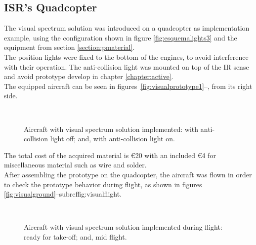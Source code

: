 \subsection{ISR's Quadcopter}
\label{subsection:pisr}

The visual spectrum solution was introduced on a quadcopter as implementation example, using the configuration shown in figure \ref{fig:esquemalights3} and the equipment from section \ref{section:pmaterial}.\\
The position lights were fixed to the bottom of the engines, to avoid interference with their operation. The anti-collision light was mounted on top of the IR sense and avoid prototype develop in chapter \ref{chapter:active}.\\
The equipped aircraft can be seen in figures~\ref{fig:visualprototype1}--, from its right side.\\
\begin{figure}[ht]
  \centering
  \hspace{8pt}
  \\
  \caption[Aircraft with Visual Spectrum Solution Implemented]{Aircraft with visual spectrum solution implemented:
			 with anti-collision light off; and,
			 with anti-collision light on.}%
  \label{fig:visualprototype}%
\end{figure}

The total cost of the acquired material is \euro{20} with an included \euro{4} for miscellaneous material such as wire and solder.\\

After assembling the prototype on the quadcopter, the aircraft was flown in order to check the prototype behavior during flight, as shown in figures \ref{fig:visualground}--subref{fig:visualflight}.\\
\begin{figure}[ht]
  \centering
  \hspace{8pt}
  \\
  \caption[Aircraft with Visual Spectrum Solution Implemented during Flight]{Aircraft with visual spectrum solution implemented during flight:
			 ready for take-off; and,
			 mid flight.}%
  \label{fig:visual}%
\end{figure}